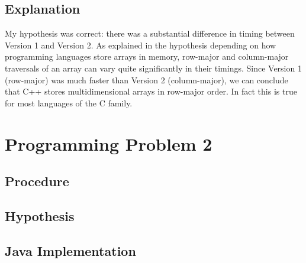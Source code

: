 \documentclass[11pt]{article}
\begin{document}
\subsection*{Explanation}

My hypothesis was correct: there was a substantial difference in timing between Version 1 and Version 2. As explained in the hypothesis depending on how programming languages store arrays in memory, row-major and column-major traversals of an array can vary quite significantly in their timings. Since Version 1 (row-major) was much faster than Version 2 (column-major), we can conclude that C++ stores multidimensional arrays in row-major order. In fact this is true for most languages of the C family.

\section*{Programming Problem 2}

\subsection*{Procedure}

\subsection*{Hypothesis}

\subsection*{Java Implementation}
\end{document}
